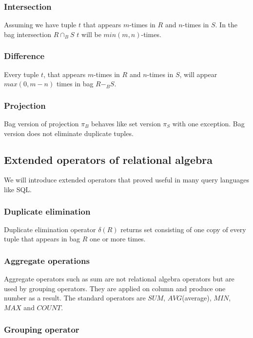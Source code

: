 \subsubsection{Intersection}

Assuming we have tuple $t$ that appears $m$-times in $R$ and $n$-times in $S$. In the bag intersection $R \cap_B S$ $t$ will be $min(m,n)$-times.

\subsubsection{Difference}
Every tuple $t$, that appears $m$-times in $R$ and $n$-times in $S$, will appear $max(0,m-n)$ times in bag $R-_B S$.

\subsubsection{Projection}
Bag version of projection $\pi_B$ behaves like set version $\pi_S$ with one exception. Bag version does not eliminate duplicate tuples.

\subsection{Extended operators of relational algebra}

We will introduce extended operators that proved useful in many query languages like SQL.


\subsubsection{Duplicate elimination}
Duplicate elimination operator $\delta(R)$ returns set consisting of one copy of every tuple that appears in bag $R$ one or more times.

\subsubsection{Aggregate operations}

Aggregate operators such as sum are not relational algebra operators but are used by grouping operators. They are applied on column and produce one number as a result. The standard operators are $SUM$, $AVG$(average), $MIN$, $MAX$ and $COUNT$.


\subsubsection{Grouping operator}

